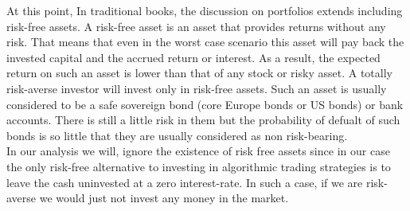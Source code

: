 At this point, In traditional books, the discussion on portfolios extends including risk-free assets. A risk-free asset is an asset that provides returns without any risk. That means that even in the worst case scenario this asset will pay back the invested capital and the accrued return or interest. As a result, the expected return on such an asset is lower than that of any stock or risky asset. A totally risk-averse investor will invest only in risk-free assets. Such an asset is usually considered to be a safe sovereign bond (core Europe bonds or US bonds) or bank accounts. There is still a little risk in them but the probability of defualt of such bonds is so little that they are usually considered as non risk-bearing. \\
In our analysis we will, ignore the existence of risk free assets since in our case the only risk-free alternative to investing in algorithmic trading strategies is to leave the cash uninvested at a zero interest-rate. In such a case, if we are risk-averse we would just not invest any money in the market.